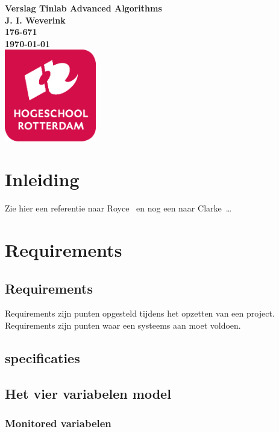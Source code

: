 \documentclass{article}
\begin{document}
\sffamily
\begin{titlepage}
  \centering
    \vfill
    {\bfseries\Huge
      Verslag Tinlab Advanced Algorithms \\
        \vskip2cm
      }
      {\bfseries\Large
        J. I. Weverink\\
      }
      {
        \bfseries\normalsize
        176-671\\
        \vskip1cm
        \today\\
    }    
    \vfill
    \includegraphics[width=4cm]{logohr.png} %
    \vfill
    \vfill
\end{titlepage}
\newpage
\tableofcontents

\newpage
\section{Inleiding}
Zie hier een referentie naar Royce~\cite{royce1987managing} en nog een naar Clarke~\cite{modelchecking}\ldots 

\section{Requirements}

\subsection{Requirements}
Requirements zijn punten opgesteld tijdens het opzetten van een project. 
Requirements zijn punten waar een systeems aan moet voldoen. 

\subsection{specificaties}

\subsection{Het vier variabelen model}
\subsubsection{Monitored variabelen}
\end{document}
